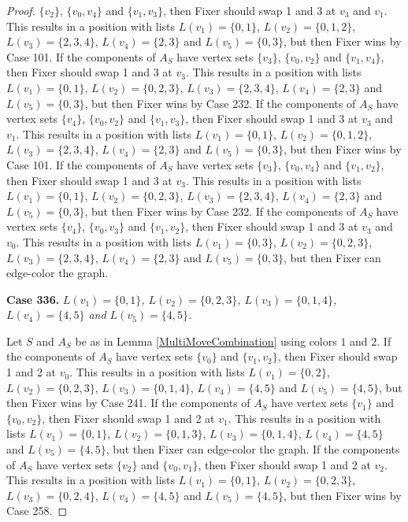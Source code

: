 \documentclass[12pt]{amsart}
\theoremstyle{plain}
\theoremstyle{definition}
\theoremstyle{remark}
\begin{document}
\begin{proof}
$\{v_2\}$, $\{v_0, v_4\}$ and $\{v_1, v_3\}$, then Fixer should swap 1 and 3 at $v_3$ and $v_1$. This results in a position with lists $L(v_1) = \{0, 1\}$, $L(v_2) = \{0, 1, 2\}$, $L(v_3) = \{2, 3, 4\}$, $L(v_4) = \{2, 3\}$ and $L(v_5) = \{0, 3\}$, but then Fixer wins by Case 101. If the components of $A_S$ have vertex sets $\{v_3\}$, $\{v_0, v_2\}$ and $\{v_1, v_4\}$, then Fixer should swap 1 and 3 at $v_3$. This results in a position with lists $L(v_1) = \{0, 1\}$, $L(v_2) = \{0, 2, 3\}$, $L(v_3) = \{2, 3, 4\}$, $L(v_4) = \{2, 3\}$ and $L(v_5) = \{0, 3\}$, but then Fixer wins by Case 232. If the components of $A_S$ have vertex sets $\{v_4\}$, $\{v_0, v_2\}$ and $\{v_1, v_3\}$, then Fixer should swap 1 and 3 at $v_3$ and $v_1$. This results in a position with lists $L(v_1) = \{0, 1\}$, $L(v_2) = \{0, 1, 2\}$, $L(v_3) = \{2, 3, 4\}$, $L(v_4) = \{2, 3\}$ and $L(v_5) = \{0, 3\}$, but then Fixer wins by Case 101. If the components of $A_S$ have vertex sets $\{v_3\}$, $\{v_0, v_4\}$ and $\{v_1, v_2\}$, then Fixer should swap 1 and 3 at $v_3$. This results in a position with lists $L(v_1) = \{0, 1\}$, $L(v_2) = \{0, 2, 3\}$, $L(v_3) = \{2, 3, 4\}$, $L(v_4) = \{2, 3\}$ and $L(v_5) = \{0, 3\}$, but then Fixer wins by Case 232. If the components of $A_S$ have vertex sets $\{v_4\}$, $\{v_0, v_3\}$ and $\{v_1, v_2\}$, then Fixer should swap 1 and 3 at $v_3$ and $v_0$. This results in a position with lists $L(v_1) = \{0, 3\}$, $L(v_2) = \{0, 2, 3\}$, $L(v_3) = \{2, 3, 4\}$, $L(v_4) = \{2, 3\}$ and $L(v_5) = \{0, 3\}$, but then Fixer can edge-color the graph. 

\noindent\textbf{Case 336.  }\textit{$L(v_1) = \{0, 1\}$, $L(v_2) = \{0, 2, 3\}$, $L(v_3) = \{0, 1, 4\}$, $L(v_4) = \{4, 5\}$ and $L(v_5) = \{4, 5\}$.}

Let $S$ and $A_S$ be as in Lemma \ref{MultiMoveCombination} using colors $1$ and $2$. If the components of $A_S$ have vertex sets $\{v_0\}$ and $\{v_1, v_2\}$, then Fixer should swap 1 and 2 at $v_0$. This results in a position with lists $L(v_1) = \{0, 2\}$, $L(v_2) = \{0, 2, 3\}$, $L(v_3) = \{0, 1, 4\}$, $L(v_4) = \{4, 5\}$ and $L(v_5) = \{4, 5\}$, but then Fixer wins by Case 241. If the components of $A_S$ have vertex sets $\{v_1\}$ and $\{v_0, v_2\}$, then Fixer should swap 1 and 2 at $v_1$. This results in a position with lists $L(v_1) = \{0, 1\}$, $L(v_2) = \{0, 1, 3\}$, $L(v_3) = \{0, 1, 4\}$, $L(v_4) = \{4, 5\}$ and $L(v_5) = \{4, 5\}$, but then Fixer can edge-color the graph. If the components of $A_S$ have vertex sets $\{v_2\}$ and $\{v_0, v_1\}$, then Fixer should swap 1 and 2 at $v_2$. This results in a position with lists $L(v_1) = \{0, 1\}$, $L(v_2) = \{0, 2, 3\}$, $L(v_3) = \{0, 2, 4\}$, $L(v_4) = \{4, 5\}$ and $L(v_5) = \{4, 5\}$, but then Fixer wins by Case 258. 


\end{proof}
\end{document}
